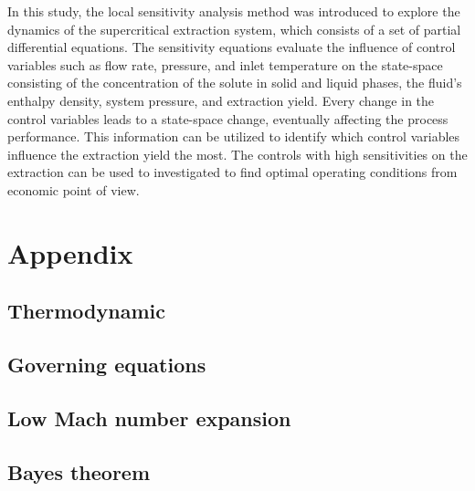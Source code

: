 \documentclass[a4paper,fleqn]{cas-dc}
\begin{document}
In this study, the local sensitivity analysis method was introduced to explore the dynamics of the supercritical extraction system, which consists of a set of partial differential equations. The sensitivity equations evaluate the influence of control variables such as flow rate, pressure, and inlet temperature on the state-space consisting of the concentration of the solute in solid and liquid phases, the fluid's enthalpy density, system pressure, and extraction yield. Every change in the control variables leads to a state-space change, eventually affecting the process performance. This information can be utilized to identify which control variables influence the extraction yield the most. The controls with high sensitivities on the extraction can be used to investigated to find optimal operating conditions from economic point of view.

\clearpage
%



\clearpage \appendix \label{appendix}
\section{Appendix} 
\subsection{Thermodynamic}


\subsection{Governing equations}


\subsection{Low Mach number expansion} \label{CH:Low_Mach_chapter}
%


\subsection{Bayes theorem} \label{CH: Bayes}

\end{document}

